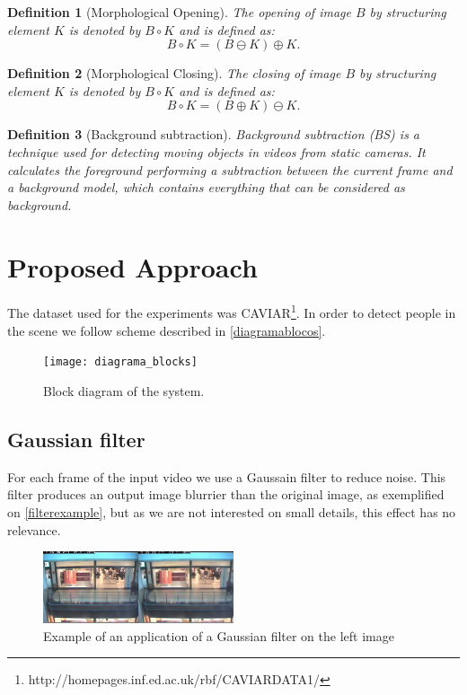\documentclass[10pt, conference]{IEEEtran}
\newtheorem{definition}{Definition}
\begin{document}
	\begin{definition}[Morphological Opening]
		The opening of image $B$ by structuring	element $K$ is denoted by $B \circ K$ and is defined as: $$B \circ K =(B \ominus K) \oplus K.$$
	\end{definition}
	
	\begin{definition}[Morphological Closing]
		The closing of image $B$ by structuring	element $K$ is denoted by $B \circ K$ and is defined as: $$B \circ K =(B \oplus K) \ominus K.$$
	\end{definition}
	
	\begin{definition}[Background subtraction]
		Background subtraction (BS) is a technique used for detecting moving objects in videos from static cameras. It calculates the foreground performing a subtraction between the current frame and a background model, which contains everything that can be considered as background.
	\end{definition}
	
	\section{Proposed Approach}
	The dataset used for the experiments was CAVIAR\footnote{http://homepages.inf.ed.ac.uk/rbf/CAVIARDATA1/}. In order to detect people in the scene we follow scheme described in \autoref{diagramablocos}.
	\begin{figure}[H]
		\centering
		\texttt{[image: diagrama\_blocks]}
		\caption{Block diagram of the system.}
		\label{diagramablocos}
	\end{figure}
	
	
	\subsection{Gaussian filter}
	For each frame of the input video we use a Gaussain filter to reduce noise. This filter produces an output image blurrier than the original image, as exemplified on \autoref{filterexample}, but as we are not interested on small details, this effect has no relevance.
	\begin{figure}[H]
		\includegraphics[width=0.5\textwidth]{filterexample}
		\centering
		\caption{Example of an application of a Gaussian filter on the left image}
		\label{filterexample}
	\end{figure}
\end{document}
